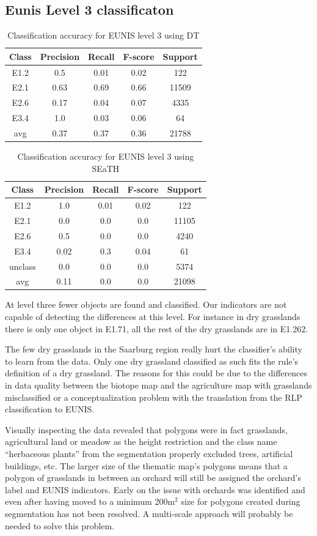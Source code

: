 \documentclass[authoryear, review,12pt,number]{elsarticle}
\begin{document}
{\subsection{Eunis Level 3 classificaton}
\begin{table}
\centering
\begin{tabular}{c c c c c}
Class & Precision & Recall & F-score & Support\\
\hline
E1.2 & 0.5 & 0.01 & 0.02 & 122\\
E2.1 & 0.63 & 0.69 & 0.66 & 11509\\
E2.6 & 0.17 & 0.04 & 0.07 & 4335\\
E3.4 & 1.0 & 0.03 & 0.06 & 64\\
avg & 0.37 & 0.37 & 0.36 & 21788\\
\end{tabular}
\caption{Classification accuracy for EUNIS level 3 using DT}
\end{table}
\begin{table}
\centering
\begin{tabular}{c c c c c}
Class & Precision & Recall & F-score & Support\\
\hline
E1.2 & 1.0 & 0.01 & 0.02 & 122\\
E2.1 & 0.0 & 0.0 & 0.0 & 11105\\
E2.6 & 0.5 & 0.0 & 0.0 & 4240\\
E3.4 & 0.02 & 0.3 & 0.04 & 61\\
unclass & 0.0 & 0.0 & 0.0 & 5374\\
avg & 0.11 & 0.0 & 0.0 & 21098\\
\end{tabular}
\caption{Classification accuracy for EUNIS level 3 using SEaTH}
\end{table}
At level three fewer objects are found and classified. Our indicators are not 
capable of detecting the differences at this level. For instance in dry 
grasslands there is only one object in E1.71, all the rest of the dry 
grasslands are in E1.262.

The few dry grasslands in the Saarburg region really hurt the classifier's 
ability to learn from the data. Only one dry grassland classified as such fits 
the rule's definition of a dry grassland. The reasons for this could be due to 
the differences in data quality between the biotope map and the agriculture map 
with grasslands misclassified or a conceptualization problem with the 
translation from the RLP classification to EUNIS. 

Visually inspecting the data revealed that polygons were in fact grasslands, 
agricultural land or meadow as the height restriction and the class name 
``herbaceous plants'' from the segmentation properly excluded trees, artificial 
buildings, etc. The larger size of the thematic map's 
polygons means that a polygon of grasslands in between an orchard will still be 
assigned the orchard's label and EUNIS indicators. Early on the issue with
orchards was identified and even after having moved to a minimum 200m$^{2}$ size for
polygons created during segmentation has not been resolved. A multi-scale
approach will probably be needed to solve this problem.

}
\end{document}

